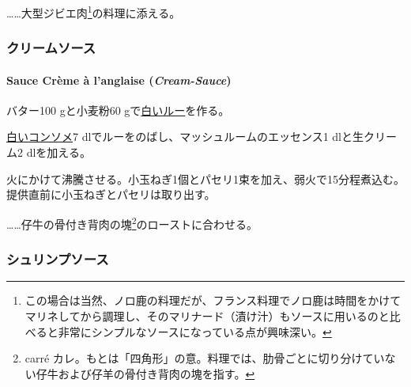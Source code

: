 \begin{recette}
\ldots{}\ldots{}大型ジビエ肉\footnote{この場合は当然、ノロ鹿の料理だが、フランス料理でノロ鹿は時間をかけてマリネしてから調理し、そのマリナード（漬け汁）もソースに用いるのと比べると非常にシンプルなソースになっている点が興味深い。}の料理に添える。

\maeaki

\hypertarget{ux30afux30eaux30fcux30e0ux30bdux30fcux30b9}{%
\subsubsection{クリームソース}\label{ux30afux30eaux30fcux30e0ux30bdux30fcux30b9}}

\hypertarget{cream-sauce}{%
\paragraph{\texorpdfstring{Sauce Crème à l'anglaise
(\emph{Cream-Sauce})}{Sauce Crème à l'anglaise (Cream-Sauce)}}\label{cream-sauce}}


バター100 gと小麦粉60
gで\protect\hyperlink{roux-blanc}{白いルー}を作る。

\protect\hyperlink{}{白いコンソメ}7
dlでルーをのばし、マッシュルームのエッセンス1 dlと生クリーム2
dlを加える。

火にかけて沸騰させる。小玉ねぎ1個とパセリ1束を加え、弱火で15分程煮込む。提供直前に小玉ねぎとパセリは取り出す。

\ldots{}\ldots{}仔牛の骨付き背肉の塊\footnote{carré
  カレ。もとは「四角形」の意。料理では、肋骨ごとに切り分けていない仔牛および仔羊の骨付き背肉の塊を指す。}のローストに合わせる。

\maeaki

\hypertarget{ux30b7ux30e5ux30eaux30f3ux30d7ux30bdux30fcux30b9}{%
\subsubsection{シュリンプソース}\label{ux30b7ux30e5ux30eaux30f3ux30d7ux30bdux30fcux30b9}}


\end{recette}
